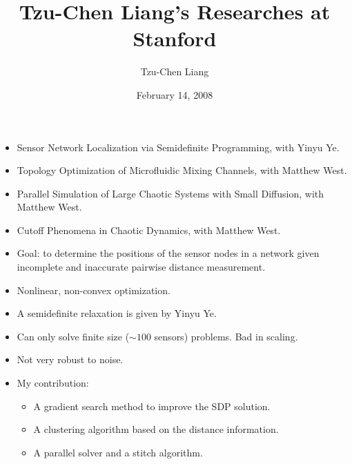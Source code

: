 \documentclass[12pt,t]{beamer}
\begin{document}
\title[Tzu-Chen's Researches]{Tzu-Chen Liang's Researches at Stanford}
\author{Tzu-Chen Liang}
\date{February 14, 2008}
\frame{\titlepage}

\begin{frame}
  \begin{itemize}
  \item Sensor Network Localization via Semidefinite Programming, with Yinyu Ye.
  \item Topology Optimization of Microfluidic Mixing Channels, with Matthew West.
  \item Parallel Simulation of Large Chaotic Systems with Small Diffusion, with Matthew West.
  \item Cutoff Phenomena in Chaotic Dynamics, with Matthew West.
  \end{itemize}

  
\end{frame}
\begin{frame}
  \begin{itemize}
  \item Goal: to determine the positions of the sensor nodes in a network given incomplete and inaccurate pairwise distance measurement. 
  \item Nonlinear, non-convex optimization. 
  \item A semidefinite relaxation is given by Yinyu Ye.
  \item Can only solve finite size ($\sim100$ sensors) problems. Bad in scaling.
  \item Not very robust to noise.   
  \item My contribution:
     \begin{itemize} 
        \item A gradient search method to improve the SDP solution.  
        \item A clustering algorithm based on the distance information.
        \item A parallel solver and a stitch algorithm.
     \end{itemize}
  \end{itemize}
\end{frame}
\end{document}
